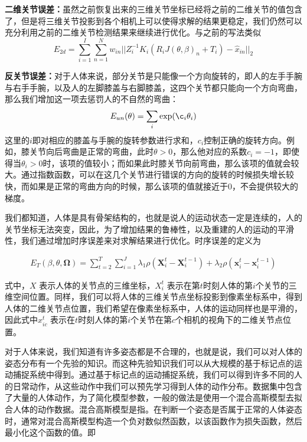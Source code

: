 \textbf{二维关节误差：}虽然之前恢复出来的三维关节坐标已经将之前的二维关节的值包含了，但是将三维关节投影到各个相机上可以使得求解的结果更稳定，我们仍然可以充分利用之前的二维关节检测结果来继续进行优化。与之前的写法类似
\begin{equation}
    E_{2d} = \sum^I_{i=1} \sum_{n=1}^N w_{in}||Z_i^{-1}K_i(R_iJ(\theta, \beta)_n + T_i) - \hat x_{in}||_2
\end{equation}

\textbf{反关节误差：}对于人体来说，部分关节是只能像一个方向旋转的，即人的左手手腕与右手手腕，以及人的左脚膝盖与右脚膝盖，这四个关节都只能向一个方向弯曲，那么我们增加这一项去惩罚人的不自然的弯曲：
\begin{equation}
    E_{un}(\theta) = \sum_i \exp(\c_i\theta_i)
\end{equation}
这里的\(i\)即对相应的膝盖与手腕的旋转参数进行求和，\(c_i\)控制正确的旋转方向。例如，膝关节向后弯曲是正常的弯曲，此时\(\theta>0\)，那么他对应的系数\(c_i = -1\)，即使得当\(\theta_i>0\)时，该项的值较小；而如果此时膝关节向前弯曲，那么该项的值就会较大。通过指数函数，可以在这几个关节进行错误的方向的旋转的时候损失增长较快，而如果是正常的弯曲方向的时候，那么该项的值就接近于0，不会提供较大的梯度。



我们都知道，人体是具有骨架结构的，也就是说人的运动状态一定是连续的，人的关节坐标无法突变，因此，为了增加结果的鲁棒性，以及重建的人的运动的平滑性，我们通过增加时序误差来对求解结果进行优化。时序误差的定义为

\begin{align} 
    E _ { T } ( \beta , \theta , \mathbf { \Omega } ) = \sum _ { t = 2 } ^ { T } \sum _ { i = 1 } ^ { J } \lambda _ { 1 } \rho \left( \mathbf { X } _ { i } ^ { t } - \mathbf { X } _ { i } ^ { t - 1 } \right) + \lambda _ { 2 } \rho \left( \mathbf { x } _ { i } ^ { t } - \mathbf { x } _ { i } ^ { t - 1 } \right)
\end{align}

式中，$X$ 表示人体的关节点的三维坐标，$X_i^t$ 表示在第$t$时刻人体的第$i$个关节的三维空间位置。同样，我们可以将人体的三维关节点坐标投影到像素坐标系中，得到人体的二维关节点位置，我们希望在像素坐标系中，人体的运动同样也是平滑的，因此式中$x_{ic}^t$ 表示在$t$时刻人体的第$i$个关节在第$c$个相机的视角下的二维关节点位置。
 
对于人体来说，我们知道有许多姿态都是不合理的，也就是说，我们可以对人体的姿态分布有一个先验的知识。而这种先验知识我们可以从大规模的基于标记点的运动捕捉系统中得到。通过基于标记点的运动捕捉系统，我们可以得到许多不同的人的日常动作，从这些动作中我们可以预先学习得到人体的动作分布。\cite{mocap}数据集中包含了大量的人体动作，为了简化模型参数，一般的做法是使用一个混合高斯模型去\cite{我也不知道哪篇}拟合人体的动作数据。混合高斯模型是指。在判断一个姿态是否属于正常的人体姿态时，通常对混合高斯模型构造一个负对数似然函数，以该函数作为损失函数，然后最小化这个函数的值。即

